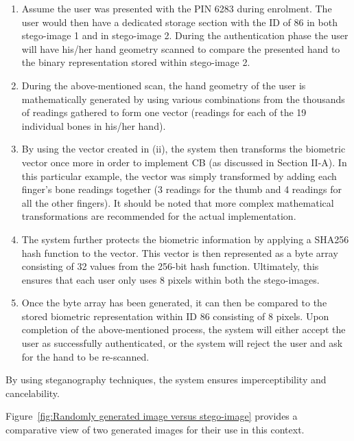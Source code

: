 \begin{enumerate}[label=\roman*.]
    
    \item  Assume the user was presented with the PIN 6283 during enrolment. The user would then have a dedicated storage section with the ID of 86 in both stego-image 1 and in stego-image 2. During the authentication phase the user will have his/her hand geometry scanned to compare the presented hand to the binary representation stored within stego-image 2. 
    
    \item  During the above-mentioned scan, the hand geometry of the user is mathematically generated by using various combinations from the thousands of readings gathered to form one vector (readings for each of the 19 individual bones in his/her hand).
    
    \item By using the vector created in (ii), the system then transforms the biometric vector once more in order to implement CB (as discussed in Section II-A). In this particular example, the vector was simply transformed by adding each finger’s bone readings together (3 readings for the thumb and 4 readings for all the other fingers). It should be noted that more complex mathematical transformations are recommended for the actual implementation.
    
    \item The system further protects the biometric information by applying a SHA256 hash function to the vector. This vector is then represented as a byte array consisting of 32 values from the 256-bit hash function. Ultimately, this ensures that each user only uses 8 pixels within both the stego-images.
    
    \item Once the byte array has been generated, it can then be compared to the stored biometric representation within ID 86 consisting of 8 pixels.
Upon completion of the above-mentioned process, the system will either accept the user as successfully authenticated, or the system will reject the user and ask for the hand to be re-scanned.

\end{enumerate}

By using steganography techniques, the system ensures imperceptibility and cancelability.

Figure~\ref{fig:Randomly generated image versus stego-image} provides a comparative view of two generated images for their use in this context. 

